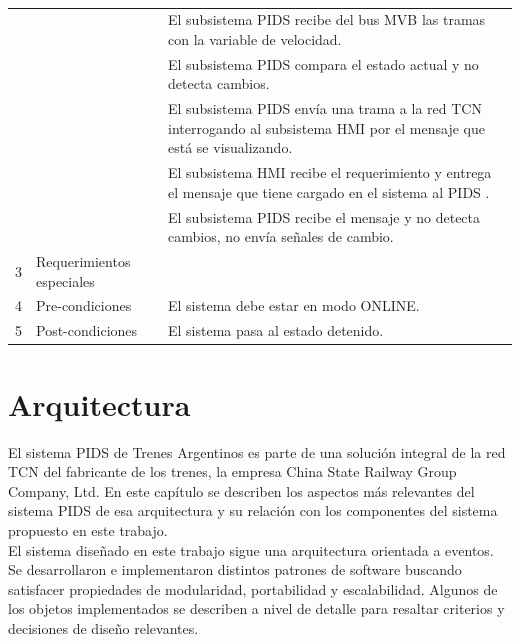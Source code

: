 \begin{table}[]
\begin{tabular}{|lll|}
\multicolumn{1}{|l|}{{ }} & \multicolumn{1}{l|}{{ }} & { El subsistema PIDS recibe del bus MVB las tramas con la variable de velocidad.} \\
 
\multicolumn{1}{|l|}{{ }} & \multicolumn{1}{l|}{{ }} & { El subsistema PIDS compara el estado actual y no detecta cambios.} \\
 
\multicolumn{1}{|l|}{{ }} & \multicolumn{1}{l|}{{ }} & { El subsistema PIDS envía una trama a la red TCN interrogando al subsistema HMI por el mensaje que está se visualizando.} \\
 
\multicolumn{1}{|l|}{{ }} & \multicolumn{1}{l|}{{ }} & { El subsistema HMI recibe el requerimiento y entrega el mensaje que tiene cargado en el sistema al PIDS .} \\
 
\multicolumn{1}{|l|}{{ }} & \multicolumn{1}{l|}{{ }} & { El subsistema PIDS recibe el mensaje y no detecta cambios, no envía señales de cambio.} \\ \hline
 
\multicolumn{1}{|r|}{{ 3}} & \multicolumn{1}{l|}{{ Requerimientos especiales}} & { } \\ \hline
 
\multicolumn{1}{|r|}{{ 4}} & \multicolumn{1}{l|}{{ Pre-condiciones}} & { El sistema debe estar en modo ONLINE.} \\ \hline
 
\multicolumn{1}{|r|}{{ 5}} & \multicolumn{1}{l|}{{ Post-condiciones}} & { El sistema pasa al estado detenido.} \\ \hline
\end{tabular}
\caption{}
\label{tab:my-table}
\end{table}


\pagebreak
\newpage
\section{Arquitectura}

El sistema PIDS de Trenes Argentinos es parte de una solución integral de la red TCN del fabricante de los trenes, la empresa China State Railway Group Company, Ltd. En este capítulo se describen los aspectos más relevantes del sistema PIDS de esa arquitectura y su relación con los componentes del sistema propuesto en este trabajo.\\

El sistema diseñado en este trabajo sigue una arquitectura orientada a eventos. Se desarrollaron e implementaron distintos patrones de software buscando satisfacer propiedades de modularidad, portabilidad y escalabilidad. Algunos de los objetos implementados se describen a nivel de detalle para resaltar criterios y decisiones de diseño relevantes. \\


